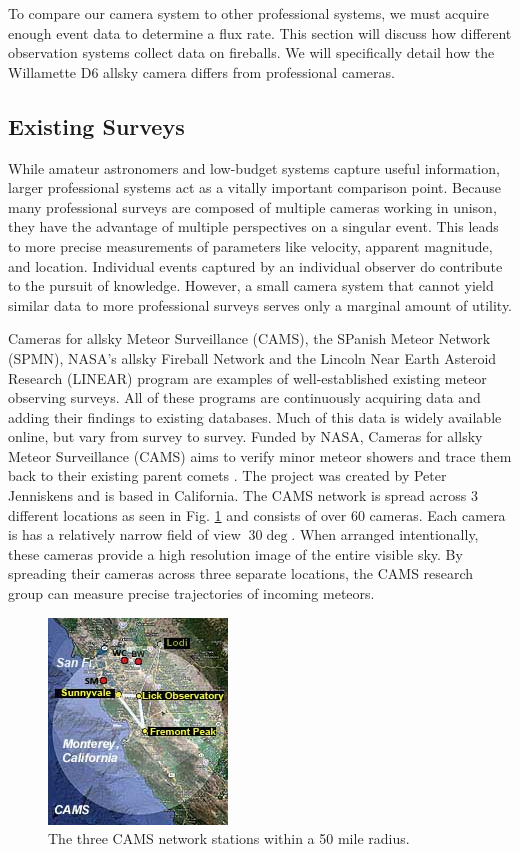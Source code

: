 To compare our camera system to other professional systems, we must acquire enough event data to determine a flux rate.  
This section will discuss how different observation systems collect data on fireballs.
We will specifically detail how the Willamette D6 allsky camera differs from professional cameras.


\subsection{Existing Surveys}
While amateur astronomers and low-budget systems capture useful information, larger professional systems act as a vitally important comparison point.
Because many professional surveys are composed of multiple cameras working in unison, they have the advantage of multiple perspectives on a singular event.
This leads to more precise measurements of parameters like velocity, apparent magnitude, and location.
Individual events captured by an individual observer do contribute to the pursuit of knowledge.
However, a small camera system that cannot yield similar data to more professional surveys serves only a marginal amount of utility.

Cameras for allsky Meteor Surveillance (CAMS), the SPanish Meteor Network (SPMN), NASA's allsky Fireball Network and the Lincoln Near Earth Asteroid Research (LINEAR) program are examples of well-established existing meteor observing surveys.
All of these programs are continuously acquiring data and adding their findings to existing databases.  
Much of this data is widely available online, but vary from survey to survey.
Funded by NASA, Cameras for allsky Meteor Surveillance (CAMS) aims to verify minor meteor showers and trace them back to their existing parent comets \cite{jenniskens_cams:_2011}.  
The project was created by Peter Jenniskens and is based in California.  
The CAMS network is spread across 3 different locations as seen in Fig. \ref{trio} and consists of over 60 cameras.
Each camera is has a relatively narrow field of view $~30\deg$.
When arranged intentionally, these cameras provide a high resolution image of the entire visible sky.
By spreading their cameras across three separate locations, the CAMS research group can measure precise trajectories of incoming meteors. 

\begin{figure}[ht!]
  \centering
  \includegraphics[scale=0.9]{images/CAMS_trio.jpg}
  \caption{The three CAMS network stations within a 50 mile radius.}
  \label{trio}
\end{figure}

